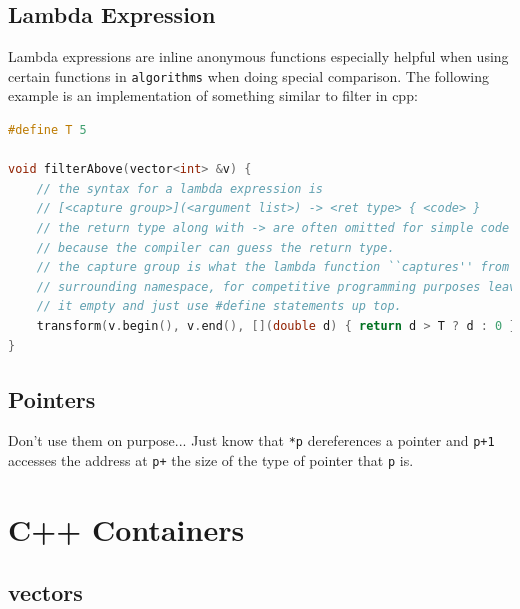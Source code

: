 \documentclass[12 pt, twoside] {article}
\begin{document}
{\subsection*{Lambda Expression}

Lambda expressions are inline anonymous functions especially helpful when using
certain functions in \texttt{algorithms} when doing special comparison. The
following example is an implementation of something similar to filter in cpp:
\begin{lstlisting}[language=c++]
#define T 5

void filterAbove(vector<int> &v) {
    // the syntax for a lambda expression is
    // [<capture group>](<argument list>) -> <ret type> { <code> }
    // the return type along with -> are often omitted for simple code
    // because the compiler can guess the return type.
    // the capture group is what the lambda function ``captures'' from the
    // surrounding namespace, for competitive programming purposes leave
    // it empty and just use #define statements up top.
    transform(v.begin(), v.end(), [](double d) { return d > T ? d : 0 });
}
\end{lstlisting}
\subsection*{Pointers}

Don't use them on purpose... Just know that \texttt{*p} dereferences a pointer
and \texttt{p+1} accesses the address at \texttt{p+} the size of the type of
pointer that \texttt{p} is.

\section*{C++ Containers}
\subsection*{vectors}

}
\end{document}
